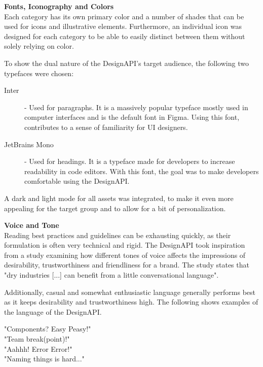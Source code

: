 \textbf{Fonts, Iconography and Colors}\\
Each category has its own primary color and a number of shades that can be used for icons and
illustrative elements. Furthermore, an individual icon was designed for each category to be able to
easily distinct between them without solely relying on color.

To show the dual nature of the DesignAPI's target audience, the following two typefaces were chosen:
\begin{description}
    \item[Inter] - Used for paragraphs. It is a massively popular typeface mostly used in
          computer interfaces and is the default font in Figma. Using this font, contributes to a sense of
          familiarity for UI designers. 

    \item[JetBrains Mono] - Used for headings. It is a typeface made for developers to increase
          readability in code editors. With this font, the goal was to make developers comfortable using
          the DesignAPI. 
\end{description}

A dark and light mode for all assets was integrated, to make it even more appealing for the target
group and to allow for a bit of personalization.

\textbf{Voice and Tone}\\
Reading best practices and guidelines can be exhausting quickly, as their formulation is often very
technical and rigid. The DesignAPI took inspiration from a study examining how different tones of
voice affects the impressions of desirability, trustworthiness and friendliness for a brand. 
The study states that "dry industries [...] can benefit from a little conversational language".

Additionally, casual and somewhat enthusiastic language generally performs best as it keeps
desirability and trustworthiness high. 
The following shows examples of the language of the DesignAPI.

"Components? Easy Peasy!"\\
"Team break(point)!"\\
"Aahhh! Error Error!"\\
"Naming things is hard..."\\

